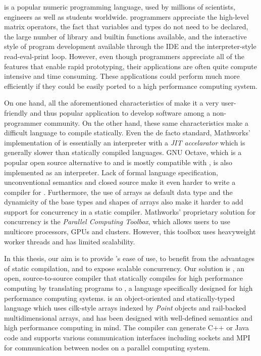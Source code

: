 \matlab is a popular numeric programming language, used by millions of
scientists, engineers as well as students worldwide\cite{MatlabGrowth}.  \matlab
programmers appreciate the high-level matrix operators,  the fact that
variables and types do not need to be declared, the large number of library and
builtin functions available, and the interactive style of program development
available through the IDE and the interpreter-style read-eval-print loop.
However, even though \matlab programmers appreciate all of the features that
enable rapid prototyping,  their applications are often quite compute intensive
and time consuming. These applications could perform much more efficiently if
they could be easily ported to a high performance computing system.  

On one hand, all the aforementioned characteristics of \matlab make it a very 
user-friendly and thus popular application to develop software among a
non-programmer community. On the other hand, these same characteristics make
\matlab a difficult language to compile statically. Even the de facto standard, 
Mathworks' 
implementation of \matlab is essentially an interpreter with a 
\emph{JIT accelarator}\cite{matlabjit} which is generally slower than statically
compiled languages. GNU Octave, which is a popular open source alternative to  
\matlab and is mostly compatible with \matlab, is also implemented as an
interpreter\cite{Octave}. 
Lack of formal language specification, unconventional semantics
and closed source make it even harder to write a compiler for \matlab.
Furthermore, the use         
of arrays as default data type and the dynamicity of the base types and         
shapes of arrays also make it harder to add support for concurrency in a        
static \matlab compiler.  Mathworks'         
proprietary solution for concurrency is the \emph{Parallel Computing            
Toolbox}\cite{pct}, which allows users to use multicore processors, GPUs        
and clusters. However, this toolbox uses heavyweight worker threads and         
has limited scalability.         

In this thesis, our aim is to provide \matlab's ease of use, to benefit from the 
advantages of static compilation, and to expose scalable concurrency.           
Our solution is \mixten, an open, source-to-source compiler that statically 
compiles \matlab for high performance computing by translating \matlab programs
to \xten\cite{x10}, a language specifically designed for high performance computing
systems. \xten is an                   
object-oriented and statically-typed language which uses cilk-style             
arrays indexed by \emph{Point} objects and rail-backed multidimensional         
arrays, and has been designed with well-defined semantics and high              
performance computing in mind.  The \xten compiler can               
generate C++ or Java code and supports various communication interfaces         
including sockets and MPI for communication between nodes on a parallel         
computing system.                                      

